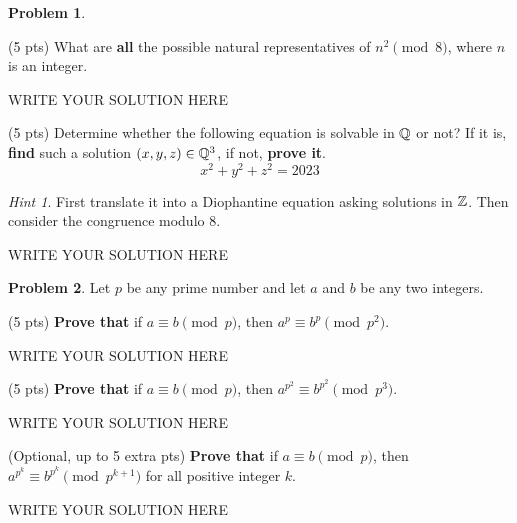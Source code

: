 \documentclass[11pt]{article}
\theoremstyle{plain}
\theoremstyle{definition}
\newtheorem{problem}{Problem}
\theoremstyle{remark}
\newtheorem*{hint}{Hint}
\numberwithin{equation}{problem}
\begin{document}
\begin{problem}
	\begin{listinprob}
		\item	(5 pts) What are \textbf{all} the possible natural representatives of $n^2\pmod 8$, where $n$ is an integer.
\begin{solution} %
WRITE YOUR SOLUTION HERE
\end{solution}\clearpage %

		\item (5 pts) Determine whether the following equation is solvable in $\mathbb{Q}$ or not? If it is, \textbf{find} such a solution $(x,y,z)\in\mathbb{Q}^3$, if not, \textbf{prove it}.
		\[
			x^2+y^2+z^2=2023
		\] 
		\begin{hint}
			First translate it into a Diophantine equation asking solutions in $\mathbb{Z}$. Then consider the congruence modulo $8$. 
		\end{hint}
	\end{listinprob}	
\end{problem}
\begin{solution} %
WRITE YOUR SOLUTION HERE
\end{solution}\clearpage %


\begin{problem}
	Let $p$ be any prime number and let $a$ and $b$ be any two integers.
	\begin{listinprob}
	\item (5 pts) \textbf{Prove that} if $a \equiv b \pmod{p}$, then $a^p \equiv b^p \pmod{p^2}$.
\begin{solution} %
WRITE YOUR SOLUTION HERE
\end{solution}\clearpage %

	\item (5 pts) \textbf{Prove that} if $a \equiv b \pmod{p}$, then $a^{p^2} \equiv b^{p^2} \pmod{p^3}$.
\begin{solution} %
WRITE YOUR SOLUTION HERE
\end{solution}\clearpage %

	\item (Optional, up to 5 extra pts) \textbf{Prove that} if $a \equiv b \pmod{p}$, then $a^{p^k} \equiv b^{p^k} \pmod{p^{k+1}}$ for all positive integer $k$.
	\end{listinprob}
\end{problem}
\begin{solution} %
WRITE YOUR SOLUTION HERE
\end{solution}\clearpage %
\end{document}
